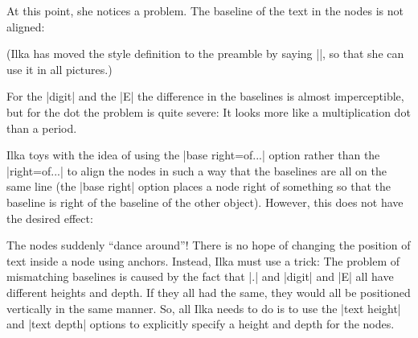 At this point, she notices a problem. The baseline of the text in the
nodes is not aligned:
\begin{codeexample}[]
\end{codeexample}
(Ilka has moved the style definition to the preamble by
saying |\tikzset{terminal/.style=...}|, so that she can use it in all
pictures.)

For the |digit| and the |E| the difference in the baselines is almost
imperceptible, but for the dot the problem is quite severe: It looks
more like a multiplication dot than a period.

Ilka toys with the idea of using the |base right=of...| option rather than
the |right=of...| to align the nodes in such a way that the baselines
are all on the same line (the |base right| option places a node
right of something so that the baseline is right of the baseline of
the other object). However, this does not have the desired effect:
\begin{codeexample}[]
\end{codeexample}
The nodes suddenly ``dance around''! There is no hope of changing the
position of text inside a node using anchors. Instead, Ilka must use a
trick: The problem of mismatching baselines is caused by the fact that
|.| and |digit| and |E| all have different heights and depth. If they
all had the same, they would all be positioned vertically in the same
manner. So, all Ilka needs to do is to use the |text height| and
|text depth| options to explicitly specify a height and depth for the
nodes.
\begin{codeexample}[]
\end{codeexample}



